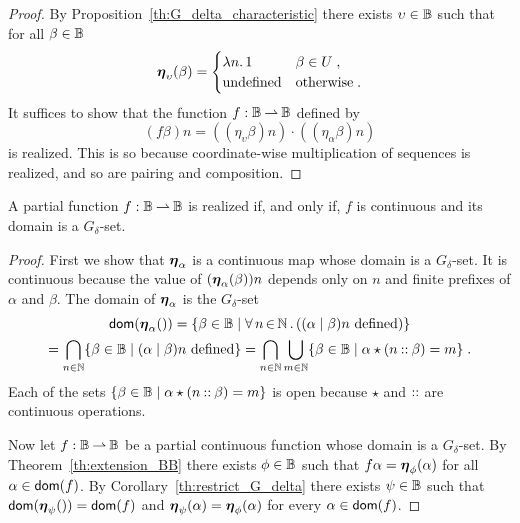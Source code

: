 \begin{proof}
  By Proposition~\ref{th:G_delta_characteristic} there exists
  $\upsilon \in \mathbb{B}$ such that for all $\beta \in \mathbb{B}$
  \begin{equation*}
    \text{\boldmath{$\eta$}}_{\upsilon}(\beta) =
    \begin{cases}
      \lambda n .\,1 & \beta \in U \;,\\
      \text{undefined} & \text{otherwise} \;.
    \end{cases}
  \end{equation*}
  It suffices to show that the function $f: \mathbb{B} \mathbin{\rightharpoonup} \mathbb{B}$ defined by
  \begin{equation*}
    (f \beta) n = ((\eta_{\upsilon} \beta) n) \cdot
                  ((\eta_{\alpha} \beta) n)
  \end{equation*}
  is realized. This is so because coordinate-wise multiplication of
  sequences is realized, and so are pairing and composition.
\end{proof}


\begin{theorem}
  A partial function $f: \mathbb{B} \mathbin{\rightharpoonup} \mathbb{B}$ is realized if, and only
  if, $f$ is continuous and its domain is a $G_\delta$-set.
\end{theorem}

\begin{proof}
  First we show that $\text{\boldmath{$\eta$}}_\alpha$ is a continuous map whose domain
  is a $G_\delta$-set. It is continuous because the value of
  $(\text{\boldmath{$\eta$}}_{\alpha}(\beta)) n$ depends only on $n$ and finite prefixes of
  $\alpha$ and $\beta$. The domain of $\text{\boldmath{$\eta$}}_\alpha$ is the
  $G_\delta$-set
  \begin{multline*}
    \dom{\fpr{\alpha}}
    = \set{\beta \in \Baire \such
      \all{n}{\NN}{(\alpha \mid \beta) n\ \text{defined}}} \\
    = \bigcap_{n \in \NN}
      \set{\beta \in \Baire \such (\alpha \mid \beta) n \ 
        \text{defined}}
    =  \bigcap_{n \in \NN}
        \bigcup_{m \in \NN}
          \set{\beta \in \Baire \such
          \alpha \star (\cons{n}{\beta}) = m} \;.
  \end{multline*}
  Each of the sets $\{\beta \in \mathbb{B} \mid \alpha \star
    (n \mathbin{{:}{:}} \beta) = m\}$ is open because $\star$ and $\mathbin{{:}{:}}$
  are continuous operations.
  
  Now let $f: \mathbb{B} \mathbin{\rightharpoonup} \mathbb{B}$ be a partial continuous function whose
  domain is a $G_\delta$-set. By Theorem~\ref{th:extension_BB} there
  exists $\phi \in \mathbb{B}$ such that $f \alpha = \text{\boldmath{$\eta$}}_{\phi}(\alpha)$ for
  all $\alpha \in \mathsf{dom}(f)$. By Corollary~\ref{th:restrict_G_delta}
  there exists $\psi \in \mathbb{B}$ such that $\mathsf{dom}(\text{\boldmath{$\eta$}}_{\psi}()) = \mathsf{dom}(f)$
  and $\text{\boldmath{$\eta$}}_{\psi}(\alpha) = \text{\boldmath{$\eta$}}_{\phi}(\alpha)$ for every $\alpha \in
  \mathsf{dom}(f)$.
\end{proof}

